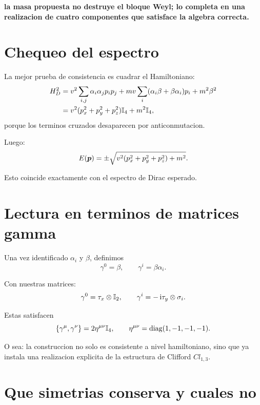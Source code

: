 \begin{displayquote}
\textbf{la masa propuesta no destruye el bloque Weyl; lo completa en una realizacion de cuatro componentes que satisface la algebra correcta.}
\end{displayquote}

\section{Chequeo del espectro}
La mejor prueba de consistencia es cuadrar el Hamiltoniano:
\begin{align}
H_D^2
&=
v^2\sum_{i,j}\alpha_i\alpha_j p_i p_j
+ mv\sum_i(\alpha_i\beta+\beta\alpha_i)p_i
+ m^2\beta^2
\notag\\
&=
v^2(p_x^2+p_y^2+p_z^2)\mathbb{I}_4 + m^2\mathbb{I}_4,
\end{align}
porque los terminos cruzados desaparecen por anticonmutacion.

Luego:
\begin{equation}
E(\bm{p})=\pm\sqrt{v^2(p_x^2+p_y^2+p_z^2)+m^2}.
\label{c08:eq:DiracSpec}
\end{equation}

Esto coincide exactamente con el espectro de Dirac esperado.

\section{Lectura en terminos de matrices gamma}
Una vez identificado \(\alpha_i\) y \(\beta\), definimos
\begin{equation}
\gamma^0=\beta,
\qquad
\gamma^i=\beta\alpha_i.
\label{c08:eq:gamma}
\end{equation}

Con nuestras matrices:
\begin{equation}
\gamma^0=\tau_x\otimes\mathbb{I}_2,
\qquad
\gamma^i=-\,\mathrm{i} \tau_y\otimes \sigma_i.
\end{equation}

Estas satisfacen
\begin{equation}
\{\gamma^\mu,\gamma^\nu\}=2\eta^{\mu\nu}\mathbb{I}_4,
\qquad
\eta^{\mu\nu}=\mathrm{diag}(1,-1,-1,-1).
\end{equation}

O sea: la construccion no solo es consistente a nivel hamiltoniano, sino que ya instala una realizacion explicita de la estructura de Clifford \(Cl_{1,3}\).

\section{Que simetrias conserva y cuales no}

